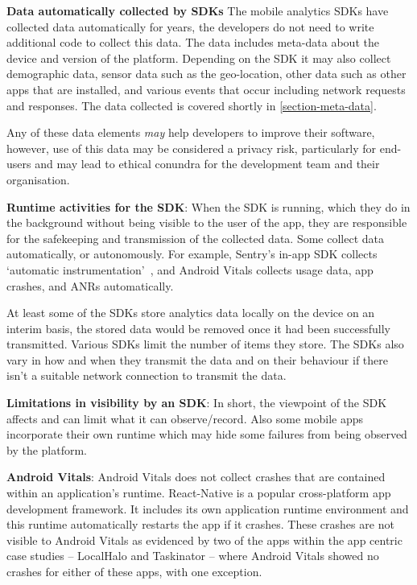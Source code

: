 \textbf{Data automatically collected by SDKs}
The mobile analytics SDKs have collected data automatically for years, the developers do not need to write additional code to collect this data. The data includes meta-data about the device and version of the platform. Depending on the SDK it may also collect demographic data, sensor data such as the geo-location, other data such as other apps that are installed, and various events that occur including network requests and responses. The data collected is covered shortly in \ref{section-meta-data}.

Any of these data elements \textit{may} help developers to improve their software, however, use of this data may be considered a privacy risk, particularly for end-users and may lead to ethical conundra for the development team and their organisation.

\textbf{Runtime activities for the SDK}: 
When the SDK is running, which they do in the background without being visible to the user of the app, they are responsible for the safekeeping and transmission of the collected data. Some collect data automatically, or autonomously. For example, Sentry's in-app SDK collects `automatic instrumentation'~\citep{sentry2021_mobile_vitals_four_metrics_every_mobile_developer_should_care_about}, and Android Vitals collects usage data, app crashes, and ANRs automatically.

At least some of the SDKs store analytics data locally on the device on an interim basis, the stored data would be removed once it had been successfully transmitted. Various SDKs limit the number of items they store. The SDKs also vary in how and when they transmit the data and on their behaviour if there isn't a suitable network connection to transmit the data.

\textbf{Limitations in visibility by an SDK}: 
In short, the viewpoint of the SDK affects and can limit what it can observe/record. Also some mobile apps incorporate their own runtime which may hide some failures from being observed by the platform.

\textbf{Android Vitals}: 
Android Vitals does not collect crashes that are contained within an application's runtime. React-Native is a popular cross-platform app development framework. It includes its own application runtime environment and this runtime automatically restarts the app if it crashes. These crashes are not visible to Android Vitals as evidenced by two of the apps within the app centric case studies -- LocalHalo and Taskinator -- where Android Vitals showed no crashes for either of these apps, with one exception. 

